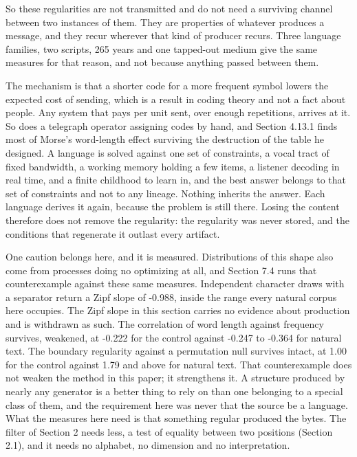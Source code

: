 So these regularities are not transmitted and do not need a surviving channel between two instances of them. They are properties of whatever produces a message, and they recur wherever that kind of producer recurs. Three language families, two scripts, 265 years and one tapped-out medium give the same measures for that reason, and not because anything passed between them.

The mechanism is that a shorter code for a more frequent symbol lowers the expected cost of sending, which is a result in coding theory and not a fact about people. Any system that pays per unit sent, over enough repetitions, arrives at it. So does a telegraph operator assigning codes by hand, and Section 4.13.1 finds most of Morse's word-length effect surviving the destruction of the table he designed. A language is solved against one set of constraints, a vocal tract of fixed bandwidth, a working memory holding a few items, a listener decoding in real time, and a finite childhood to learn in, and the best answer belongs to that set of constraints and not to any lineage. Nothing inherits the answer. Each language derives it again, because the problem is still there. Losing the content therefore does not remove the regularity: the regularity was never stored, and the conditions that regenerate it outlast every artifact.

One caution belongs here, and it is measured. Distributions of this shape also come from processes doing no optimizing at all, and Section 7.4 runs that counterexample against these same measures. Independent character draws with a separator return a Zipf slope of -0.988, inside the range every natural corpus here occupies. The Zipf slope in this section carries no evidence about production and is withdrawn as such. The correlation of word length against frequency survives, weakened, at -0.222 for the control against -0.247 to -0.364 for natural text. The boundary regularity against a permutation null survives intact, at 1.00 for the control against 1.79 and above for natural text. That counterexample does not weaken the method in this paper; it strengthens it. A structure produced by nearly any generator is a better thing to rely on than one belonging to a special class of them, and the requirement here was never that the source be a language. What the measures here need is that something regular produced the bytes. The filter of Section 2 needs less, a test of equality between two positions (Section 2.1), and it needs no alphabet, no dimension and no interpretation.

